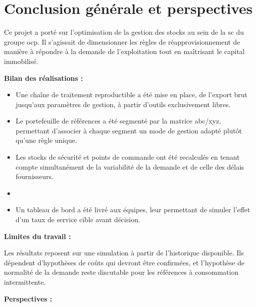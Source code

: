 \chapter*{Conclusion générale et perspectives}

\hspace{1cm}Ce projet a porté sur l'optimisation de la gestion des stocks au
sein de la \gls{sc} du groupe \gls{ocp}. Il s'agissait de dimensionner les
règles de réapprovisionnement de manière à répondre à la demande de
l'exploitation tout en maîtrisant le capital immobilisé.

\vspace{0.5cm}
\textbf{Bilan des réalisations :}

\begin{itemize}
  \item Une chaîne de traitement reproductible a été mise en place, de l'export
    brut jusqu'aux paramètres de gestion, à partir d'outils exclusivement
    libres.
  \item Le portefeuille de références a été segmenté par la matrice
    \gls{abc}/\gls{xyz}, permettant d'associer à chaque segment un mode de
    gestion adapté plutôt qu'une règle unique.
  \item Les stocks de sécurité et points de commande ont été recalculés en
    tenant compte simultanément de la variabilité de la demande et de celle des
    délais fournisseurs.
  \item [Rappeler ici les gains chiffrés obtenus, en taux de service et en
    valeur de stock.]
  \item Un tableau de bord a été livré aux équipes, leur permettant de simuler
    l'effet d'un taux de service cible avant décision.
\end{itemize}

\vspace{0.5cm}
\textbf{Limites du travail :}

Les résultats reposent sur une simulation à partir de l'historique disponible.
Ils dépendent d'hypothèses de coûts qui devront être confirmées, et l'hypothèse
de normalité de la demande reste discutable pour les références à consommation
intermittente.

\vspace{0.5cm}
\textbf{Perspectives :}


